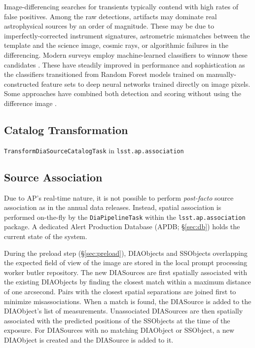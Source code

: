 Image-differencing searches for transients typically contend with high rates of false positives.
Among the raw detections, artifacts may dominate real astrophysical sources by an order of magnitude.
These may be due to imperfectly-corrected instrument signatures, astrometric mismatches between the template and the science image, cosmic rays, or algorithmic failures in the differencing.
Modern surveys employ machine-learned classifiers to winnow these candidates \citep[e.g.,][]{Bailey:07:NearbySNFML,Bloom:12:RealBogus,Brink:13:RB2,Wright:15:PS1ML,Goldstein:15:DESRealBogus,Duev:19:Braii}.
These have steadily improved in performance and sophistication as the classifiers transitioned from Random Forest models trained on manually-constructed feature sets to deep neural networks trained directly on image pixels.
Some approaches have combined both detection and scoring without using the difference image \citep{Sedaghat:17:Transinet,Acero-Cuellar:22:NoDifference}.


\subsection{Catalog Transformation}

\texttt{TransformDiaSourceCatalogTask} in  \texttt{lsst.ap.association}


\subsection{Source Association}

Due to AP's real-time nature, it is not possible to perform \textit{post-facto} source association as in the annual data releases.
Instead, spatial association is performed on-the-fly by the \texttt{DiaPipelineTask} within the \texttt{lsst.ap.association} package.
A dedicated Alert Production Database (APDB; \S \ref{sec:db}) holds the current state of the system.

During the preload step (\S \ref{sec:preload}), DIAObjects and SSObjects overlapping the expected field of view of the image are stored in the local prompt processing worker butler repository.
The new DIASources are first spatially associated with the existing DIAObjects by finding the closest match within a maximum distance of one arcsecond.
Pairs with the closest spatial separations are joined first to minimize misassociations.
When a match is found, the DIASource is added to the DIAObject's list of measurements.
Unassociated DIASources are then spatially associated with the predicted positions of the SSObjects at the time of the exposure.
For DIASources with no matching DIAObject or SSObject, a new DIAObject is created and the DIASource is added to it.



